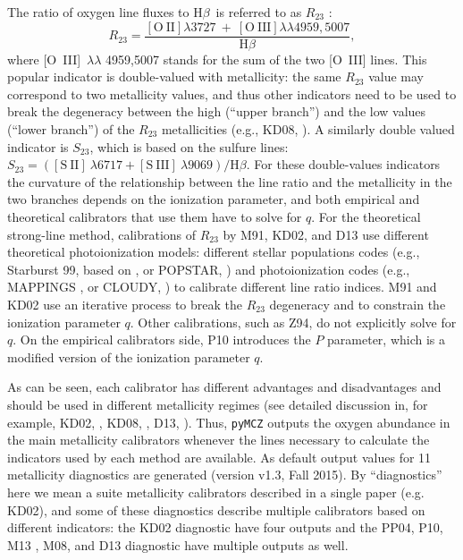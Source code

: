\documentclass{emulateapj}
\newcommand{\hb}{\ensuremath{\mathrm{H}\beta}}
\begin{document}
The ratio of oxygen line fluxes to \hb~is referred to as $R_{23}$
\citep{pagel79}:
$$R_{23}=\frac{\mathrm{[O~II]} \lambda 3727~+~\mathrm{[O~III]}
  \lambda\lambda 4959, 5007}{\hb},$$ where [O~III]~$\lambda\lambda$
4959,5007 stands for the sum of the two [O~III] lines.  This popular
indicator is double-valued with metallicity: the same $R_{23}$ value
may correspond to two metallicity values, and thus other indicators
need to be used to break the degeneracy between the high (``upper
branch'') and the low values (``lower branch'') of the $R_{23}$
metallicities (e.g., KD08, \citealt{moustakas10}). A similarly double
valued indicator is $S_{23}$, which is based on the sulfure lines: $
S_{23}=( \mathrm{[S~II]}~\lambda6717+\mathrm{[S~III]}~\lambda9069) /
\hb $.  For these double-values indicators the curvature of the
relationship between the line ratio and the metallicity in the two
branches depends on the ionization parameter, and both empirical and
theoretical calibrators that use them have to solve for $q$.  For the
theoretical strong-line method, calibrations of $R_{23}$ by M91, KD02,
and D13 use different theoretical photoionization models: different
stellar populations codes (e.g., Starburst 99, based on
\citealt{bruzual93}, or POPSTAR, \citealt{molla09}) and
photoionization codes (e.g., MAPPINGS \citealt{allen08}, or CLOUDY,
\citealt{ferland98}) to calibrate different line ratio indices.  M91
and KD02 use an iterative process to break the $R_{23}$ degeneracy and
to constrain the ionization parameter $q$. Other calibrations, such as
Z94, do not explicitly solve for $q$.  On the empirical calibrators
side, P10 introduces the $P$ parameter, which is a modified version of
the ionization parameter $q$.

As can be seen, each calibrator has different advantages and
disadvantages and should be used in different metallicity regimes (see
detailed discussion in, for example, KD02, \citealt{stasinska02},
KD08, \citealt{moustakas10,lopezsanchez12}, D13,
\citealt{blanc15}). Thus, \verb=pyMCZ= outputs the oxygen abundance in
the main metallicity calibrators whenever the lines necessary to
calculate the indicators used by each method are available. As default
output values for 11 metallicity diagnostics are generated (version
v1.3, Fall 2015). By ``diagnostics'' here we mean a suite metallicity
calibrators described in a single paper (e.g. KD02), and some of these
diagnostics describe multiple calibrators based on different
indicators: the KD02 diagnostic have four outputs and the PP04, P10,
M13 , M08, and D13 diagnostic have multiple outputs as well.
\end{document}
